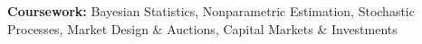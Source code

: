 \textbf{Coursework:} Bayesian Statistics, Nonparametric Estimation, Stochastic Processes, Market Design \& Auctions, Capital Markets \& Investments
